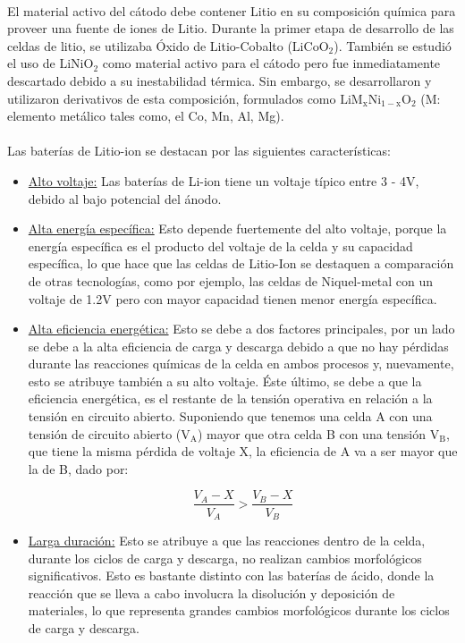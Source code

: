 \documentclass[10pt,a4paper]{article}
\begin{document}
\\
El material activo del cátodo debe contener Litio en su composición química para proveer una fuente de iones de Litio. Durante la primer etapa de desarrollo de las celdas de litio, se utilizaba Óxido de Litio-Cobalto ($\mathrm{LiCoO_2}$). También se estudió el uso de $\mathrm{LiNiO_2}$ como material activo para el cátodo pero fue inmediatamente descartado debido a su inestabilidad térmica. Sin embargo, se desarrollaron y utilizaron derivativos de esta composición, formulados como $\mathrm{LiM_xNi_{1-x}O_2}$ (M: elemento metálico tales como, el Co, Mn, Al, Mg).\\
\\
Las baterías de Litio-ion se destacan por las siguientes características:
\begin{itemize}
	\item \underline{Alto voltaje:} Las baterías de Li-ion tiene un voltaje típico entre 3 - 4V, debido al bajo potencial del ánodo.
	\item \underline{Alta energía específica:} Esto depende fuertemente del alto voltaje, porque la energía específica es el producto del voltaje de la celda y su capacidad específica, lo que hace que las celdas de Litio-Ion se destaquen a comparación de otras tecnologías, como por ejemplo, las celdas de Niquel-metal con un voltaje de 1.2V pero con mayor capacidad tienen menor energía específica. 
	\item \underline{Alta eficiencia energética:} Esto se debe a dos factores principales, por un lado se debe a la alta eficiencia de carga y descarga debido a que no hay pérdidas durante las reacciones químicas de la celda en ambos procesos y, nuevamente, esto se atribuye también a su alto voltaje. Éste último, se debe a que la eficiencia energética, es el restante de la tensión operativa en relación a la tensión en circuito abierto. Suponiendo que tenemos una celda A con una tensión de circuito abierto ($\mathrm{V_A}$) mayor que otra celda  B con una tensión $\mathrm{V_B}$, que tiene la misma pérdida de voltaje X, la eficiencia de A va a ser mayor que la de B, dado por:

\clearpage
	\begin{equation}
		\frac{V_A - X}{V_A} > \frac{V_B - X}{V_B} \nonumber
	\end{equation}
	\item \underline{Larga duración:} Esto se atribuye a que las reacciones dentro de la celda, durante los ciclos de carga y descarga, no realizan cambios morfológicos significativos. Esto es bastante distinto con las baterías de ácido, donde la reacción que se lleva a cabo involucra la disolución y deposición de materiales, lo que representa grandes cambios morfológicos durante los ciclos de carga y descarga.

\end{itemize}
\end{document}
